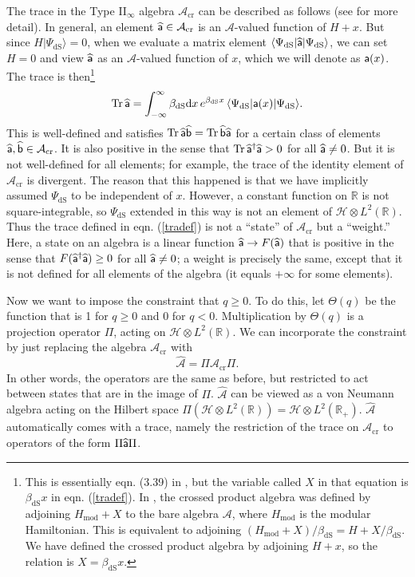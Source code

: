 \documentclass[11pt,a4paper]{article}
\def\a{{\sf a}}
\def\b{{\sf b}}
\def\mod{{\mathrm{mod}}}
\def\be{\begin{equation}}
\def\ee{\end{equation}}
\def\h{\widehat}
\def\A{{\mathcal A}}
\def\d{{\mathrm d}}
\def\b{\overline}
\def\R{{\mathbb R}}
\def\h{\widehat}
\def\H{{\mathcal H}}
\def\dS{{\mathrm{dS}}}
\def\la{\langle}
\def\ra{\rangle}
\def\cr{{\mathrm{cr}}}
\def\Tr{{\mathrm{Tr}}}
\def\b{{\sf b}}
\begin{document}
The trace in the Type II$_\infty$ algebra $\A_\cr$ can be described as follows (see \cite{GCP} for more detail).    In general, an element  $\h\a\in \A_\cr$ is an $\A$-valued function of $H+x$.
But since $H|\Psi_\dS\ra=0$, when we evaluate a matrix element $\la\Psi_\dS|\h\a|\Psi_\dS\ra$, we can set $H=0$ and view $\h\a$ as an $\A$-valued function of $x$,
which we will denote as $\a(x)$.    The trace is then\footnote{This is essentially eqn. (3.39) in \cite{GCP}, but the variable called $X$ in that equation is $\beta_\dS x$
in eqn. (\ref{tradef}).     In \cite{GCP}, the crossed product algebra was defined by adjoining $H_\mod+X$ to the bare algebra $\A$, where $H_\mod$ is the modular
Hamiltonian.   This is equivalent to adjoining $(H_\mod+X)/\beta_\dS=H+X/\beta_\dS$.   We have defined the crossed product algebra by adjoining $H+x$, so the relation
is $X=\beta_\dS x$.}
\be\label{tradef}\Tr\,\h \a =\int_{-\infty}^\infty \beta_\dS \d x\,e^{\beta_\dS x} \,\la\Psi_\dS|\a(x)|\Psi_\dS\ra.   \ee
This is well-defined and satisfies $\Tr\,\h\a\h\b=\Tr\,\h\b\h\a$ for a certain class of elements $\h\a,\h\b\in\A_\cr$.   
It is also positive in the sense that $\Tr\,\h\a^\dagger\h\a>0$ for all $\h\a\not=0$.   
 But it is not well-defined for all elements;
for example, the trace of the identity element of $\A_\cr$ is divergent.   The reason that this happened is that we have implicitly assumed $\Psi_\dS$ to be 
independent of $x$.   However, a constant function  on $\R$ is not  square-integrable, so $\Psi_\dS$ extended in this way is not an element of $\H\otimes L^2(\R)$.
Thus the trace defined in eqn. (\ref{tradef}) is not a ``state'' of $\A_\cr$  but a  ``weight.''   Here, a  state on an algebra 
is a linear function $\h\a\to F(\h\a)$  that is positive in the sense that
$F(\h\a^\dagger \h\a)\geq 0$ for all $\h\a\not=0$; a weight is precisely the same, except that it is not defined for all elements of the algebra (it equals
$+\infty$ for some elements). 



Now we want to impose the constraint that $q\geq 0$.   To do this, let $\Theta(q)$ be the function that is 1 for $q\geq 0$ and 0 for $q<0$.   Multiplication by
$\Theta(q)$ is a projection operator $\Pi$, acting on $\H\otimes L^2(\R)$.   We can incorporate the constraint by just replacing the algebra $\A_\cr$ with
\be\label{repalg}\h\A=\Pi \A_\cr \Pi. \ee
In other words, the operators are the same as before, but restricted to act between states that are in the image of $\Pi$.   $\h\A$ can be viewed as a von Neumann
algebra acting on the Hilbert space $\Pi(\H\otimes L^2(\R))=\H\otimes L^2(\R_+)$.   $\h\A$ automatically comes with a trace, namely the restriction of the trace
on $\A_\cr$ to operators of the form $\Pi\h\a\Pi$.  
\end{document}
